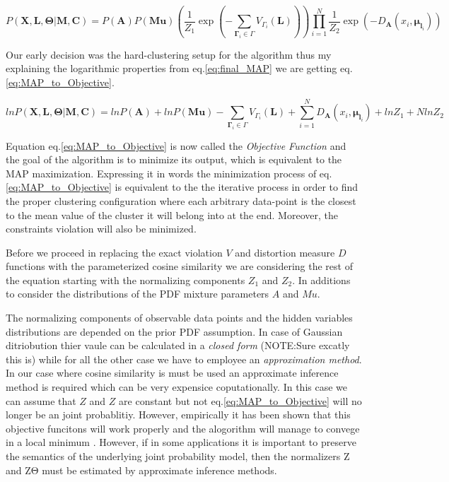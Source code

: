 \documentclass[dvips,dvipdfm,pdftex]{llncs}
\begin{document}
\begin{equation}
	P(\mathbf{X,L,\Theta}|\mathbf{M,C})=P(\mathbf{A})P(\mathbf{Mu})(\frac{1}{Z_{1}}\exp(-\sum_{\mathbf{\Gamma}_{i}\in\Gamma}V_{\Gamma_{i}}(\mathbf{L})))\prod_{i=1}^{N}\frac{1}{Z_{2}}\exp(-D_{\mathbf{A}}(x_{i},\mathbf{\mu}_{\mathbf{l}_{i}}))
\label{eq:final_MAP}
\end{equation}


Our early decision was the hard-clustering setup for the algorithm thus my explaining the logarithmic properties from eq.\ref{eq:final_MAP} we are getting eq.\ref{eq:MAP_to_Objective}.

\begin{equation}
	lnP(\mathbf{X,L,\Theta}|\mathbf{M,C})=lnP(\mathbf{A})+lnP(\mathbf{Mu})-\sum_{\mathbf{\Gamma}_{i}\in\Gamma}V_{\Gamma_{i}}(\mathbf{L})+\sum_{i=1}^{N}D_{\mathbf{A}}(x_{i},\mathbf{\mu}_{\mathbf{l}_{i}})+lnZ_{1}+NlnZ_{2}
\label{eq:MAP_to_Objective}
\end{equation}

Equation eq.\ref{eq:MAP_to_Objective} is now called the \emph{Objective Function} and the goal of the algorithm is to minimize its output, which is equivalent to the MAP maximization. Expressing it in words the minimization process of eq.\ref{eq:MAP_to_Objective} is equivalent to the the iterative process in order to find the proper clustering configuration where each arbitrary data-point is the closest to the mean value of the cluster it will belong into at the end. Moreover, the constraints violation will also be minimized.

Before we proceed in replacing the exact violation $V$ and distortion measure $D$ functions with the parameterized cosine similarity we are considering the rest of the equation starting with the normalizing components $Z_{1}$ and $Z_{2}$. In additions to consider the distributions of the PDF mixture parameters $A$ and $Mu$.

The normalizing components of observable data points and the hidden variables distributions are depended on the prior PDF assumption. In case of Gaussian ditriobution thier vaule can be calculated in a \emph{closed form} (NOTE:Sure excatly this is) while for all the other case we have to employee an \emph{approximation method}. In our case where cosine similarity is must be used an approximate inference method is required which can be very expensice coputationally. In this case we can assume that $Z$ and $Z$ are constant but not eq.\ref{eq:MAP_to_Objective} will no longer be an joint probablitiy. However, empirically it has been shown that this objective funcitons will work properly and the alogorithm will manage to convege in a local minimum \cite{basu2004probabilistic}. However, if in some applications it is important to preserve the semantics of the underlying joint probability model, then the normalizers Z and ZΘ must be estimated by approximate inference methods.

 




\end{document}
